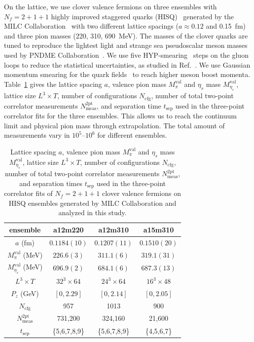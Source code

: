 On the lattice, we use clover valence fermions on three ensembles with $N_f = 2+1+1$ highly improved staggered quarks (HISQ)~\cite{Follana:2006rc} generated by the MILC Collaboration~\cite{Bazavov:2012xda} with two different lattice spacings ($a\approx 0.12$ and 0.15~fm) and three pion masses (220, 310, 690~MeV).
The masses of the clover quarks are tuned to reproduce the lightest light and strange sea pseudoscalar meson masses used by PNDME Collaboration~\cite{Rajan:2017lxk,Bhattacharya:2015wna,Bhattacharya:2015esa,Bhattacharya:2013ehc}.
%
We use five HYP-smearing~\cite{Hasenfratz:2001hp} steps on the gluon loops to reduce the statistical uncertainties, as studied in Ref.~\cite{Fan:2018dxu}.
We use Gaussian momentum smearing for the quark fields~\cite{Bali:2016lva} to reach higher meson boost momenta.
Table~\ref{table-data} gives the lattice spacing $a$, valence pion mass $M_\pi^\text{val}$ and $\eta_s$ mass $M_{\eta_s}^\text{val}$, lattice size $L^3\times T$, number of configurations $N_\text{cfg}$, number of total two-point correlator measurements $N_\text{meas}^\text{2pt}$, and separation time $t_\text{sep}$ used in the three-point correlator fits for the three ensembles.
This allows us to reach the continuum limit and physical pion mass through extrapolation.
The total amount of measurements vary in $10^5$--$10^6$ for different ensembles.


\begin{table}[!htbp]
\centering
\begin{tabular}{|c|c|c|c|}
\hline
  ensemble  & a12m220 & a12m310 & a15m310 \\
\hline
  $a$ (fm)  & $0.1184(10)$ & $0.1207(11)$  & $0.1510(20)$ \\
\hline
  $M_{\pi}^\text{val}$ (MeV)  & $226.6(3)$ & $311.1(6)$ & $319.1(31)$\\
\hline
  $M_{\eta_s}^\text{val}$ (MeV)  & $696.9(2)$ & $684.1(6)$ & $687.3(13)$\\
\hline
  $L^3\times T$  & $32^3\times 64$ & $24^3\times 64$ & $16^3\times 48$ \\
\hline
  $P_z$ (GeV)  & $[0,2.29]$ &  $[0,2.14]$ &  $[0,2.05]$ \\
\hline
  $N_\text{cfg}$  & 957 & 1013 & 900 \\
\hline
  $N_\text{meas}^\text{2pt}$  &  731,200  & 324,160 & 21,600 \\
\hline
  $t_\text{sep}$  & \{5,6,7,8,9\}   & \{5,6,7,8,9\} & \{4,5,6,7\} \\
\hline
\end{tabular}
\caption{
Lattice spacing $a$, valence pion mass $M_\pi^\text{val}$ and $\eta_s$ mass $M_{\eta_s}^\text{val}$, lattice size $L^3\times T$, number of configurations $N_\text{cfg}$, number of total two-point correlator measurements $N_\text{meas}^\text{2pt}$, and separation times $t_\text{sep}$ used in the three-point correlator fits of $N_f=2+1+1$ clover valence fermions on HISQ ensembles generated by MILC Collaboration and analyzed in this study.
}
\label{table-data}
\end{table}


